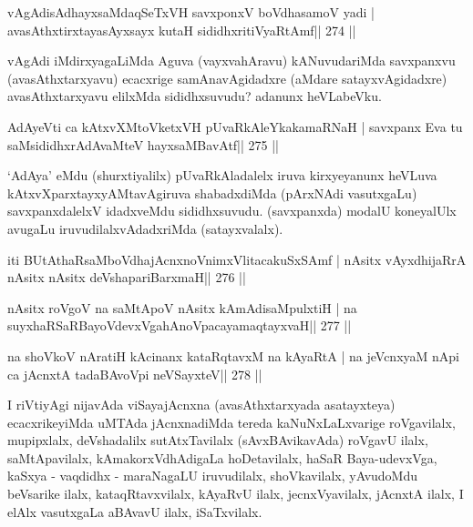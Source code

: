 \begin{shl}
vAgAdisAdhayxsaMdaqSeTxVH \footnotemark[1]savxponxV \footnotemark[2]boVdhasamoV yadi |
avasAthxtirxtayasAyxsayx kutaH sididhxritiVyaRtAmf\hfill || 274 ||
\end{shl}

\begin{artha}
vAgAdi iMdirxyagaLiMda Aguva (vayxvahAravu) kANuvudariMda savxpanxvu (avasAthxtarxyavu) ecacxrige samAnavAgidadxre (aMdare satayxvAgidadxre) avasAthxtarxyavu elilxMda sididhxsuvudu? adanunx heVLabeVku.
\end{artha}

\begin{shl}
AdAyeVti ca kAtxvXMtoVketxVH pUvaRkAleYkakamaRNaH |
savxpanx Eva tu saMsididhxrAdAvaMteV hayxsaMBavAtf\hfill || 275 ||
\end{shl}

\begin{artha}
`AdAya' eMdu (shurxtiyalilx) pUvaRkAladalelx iruva kirxyeyanunx heVLuva kAtxvXparxtayxyAMtavAgiruva shabadxdiMda (pArxNAdi vasutxgaLu) savxpanxdalelxV idadxveMdu sididhxsuvudu. (savxpanxda) modalU koneyalUlx avugaLu iruvudilalxvAdadxriMda (satayxvalalx).
\end{artha}


\begin{shl}
iti BUtAthaRsaMboVdhajAcnxnoVnimxVlitacakuSxSAmf |
nAsitx vAyxdhijaRrA nAsitx nAsitx deVshapariBarxmaH\hfill || 276 ||
\end{shl}

\begin{shl}
nAsitx roVgoV na saMtApoV nAsitx kAmAdisaMpulxtiH |
na suyxhaRSaRBayoVdevxVgahAnoVpacayamaqtayxvaH\hfill || 277 ||
\end{shl}

\begin{shl}
na shoVkoV nAratiH kAcinanx kataRqtavxM na kAyaRtA |
na jeVcnxyaM nApi ca jAcnxtA tadaBAvoV\s pi neVSayxteV\hfill || 278 ||
\end{shl}

\begin{artha}
I riVtiyAgi nijavAda viSayajAcnxna (avasAthxtarxyada asatayxteya) 
ecacxrikeyiMda uMTAda jAcnxnadiMda tereda kaNuNxLaLxvarige roVgavilalx, mupipxlalx, deVshadalilx sutAtxTavilalx (sAvxBAvikavAda) roVgavU ilalx, saMtApavilalx, kAmakorxVdhAdigaLa hoDetavilalx, haSaR Baya-udevxVga, kaSxya - vaqdidhx - maraNagaLU iruvudilalx, shoVkavilalx, yAvudoMdu beVsarike ilalx, kataqRtavxvilalx, kAyaRvU ilalx, jecnxVyavilalx, jAcnxtA ilalx, I elAlx vasutxgaLa aBAvavU ilalx, iSaTxvilalx.
\end{artha}

